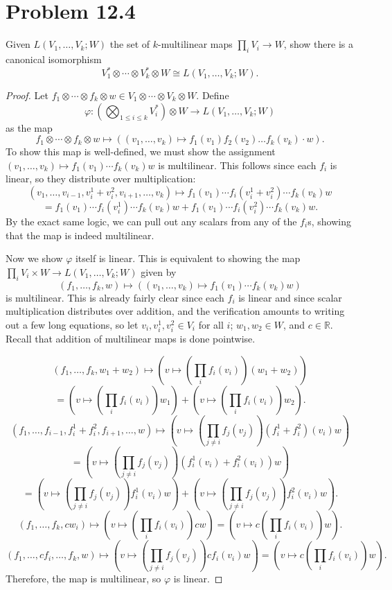 \documentclass[11pt, letterpaper]{article}
\begin{document}
\section{Problem 12.4}
\begin{problem}
	Given $L(V_1, \ldots ,V_k;W)$ the set of $k$-multilinear maps $\prod_{i} V_i \to W$, show there is a canonical isomorphism
	\[
		V_1^* \otimes \cdots \otimes V_k^* \otimes W \cong L(V_1, \ldots ,V_k;W)
	.\]
\end{problem}
\begin{proof}
	Let $f_1 \otimes \cdots \otimes f_k \otimes w\in V_1 \otimes \cdots \otimes V_k \otimes W$. Define
	\[
		\varphi : \left( \bigotimes_{1\leq i\leq k} V_i^* \right) \otimes W \to L(V_1, \ldots ,V_k;W)
	\]
	as the map
	\[
		f_1 \otimes \cdots \otimes f_k \otimes w \mapsto \left( (v_1, \ldots ,v_k)\mapsto f_1(v_1)f_2(v_2) \ldots f_k(v_k)\cdot w \right) 
	.\]
	To show this map is well-defined, we must show the assignment $(v_1, \ldots ,v_k)\mapsto f_1(v_1)\cdots f_k(v_k)w$ is multilinear. This follows since each $f_i$ is linear, so they distribute over multiplication:
	\[
		(v_1, \ldots ,v_{i-1} ,v_i^1+v_i^2, v_{i+1} , \ldots ,v_k)\mapsto f_1(v_1)\cdots f_i(v_i^1 + v_i^2)\cdots f_k(v_k)w
	\]
	\[
		=f_1(v_1)\cdots f_i(v_i^1)\cdots f_k(v_k)w+f_1(v_1)\cdots f_i(v_i^2)\cdots f_k(v_k)w
	.\]
	By the exact same logic, we can pull out any scalars from any of the $f_i$s, showing that the map is indeed multilinear.

	Now we show $\varphi $ itself is linear. This is equivalent to showing the map $\prod_{i} V_i \times W \to L(V_1, \ldots ,V_k;W)$ given by
	\[
		(f_1, \ldots ,f_k,w)\mapsto \left( (v_1, \ldots ,v_k)\mapsto f_1(v_1) \cdots f_k(v_k)w \right) 
	\]
	is multilinear. This is already fairly clear since each $f_i$ is linear and since scalar multiplication distributes over addition, and the verification amounts to writing out a few long equations, so let $v_i,v_i^1,v_i^2\in V_i$ for all $i$; $w_1,w_2\in W$, and $c\in \mathbb{R} $. Recall that addition of multilinear maps is done pointwise.

	\[
		(f_1, \ldots ,f_k, w_1 + w_2) \mapsto \left( v\mapsto \left( \prod_{i} f_i(v_i) \right) (w_1+w_2) \right) 
	\]
	\[
		=\left( v\mapsto \left( \prod_{i} f_i(v_i) \right) w_1 \right) +\left( v\mapsto \left( \prod_{i} f_i(v_i) \right) w_2 \right) 
	.\]
	\[
		\left( f_1, \ldots ,f_{i-1} ,f_i^1 + f_i^2, f_{i+1} , \ldots ,w \right) \mapsto \left( v\mapsto \left( \prod_{j \neq i} f_j(v_j) \right) (f_i^1+f_i^2)(v_i)w \right) 
	\]
	\[
		=\left( v\mapsto \left( \prod_{j \neq i} f_j(v_j) \right) (f_i^1(v_i)+f_i^2(v_i))w \right) 
	\]
	\[
		=\left( v\mapsto \left( \prod_{j \neq i} f_j(v_j) \right) f_i^1(v_i)w \right) +\left( v\mapsto \left( \prod_{j \neq i} f_j(v_j) \right) f_i^2(v_i)w \right) 
	.\]
	\[
		(f_1, \ldots ,f_k,cw_i)\mapsto \left( v\mapsto \left( \prod_{i} f_i(v_i) \right) cw \right) =\left( v\mapsto c\left( \prod_{i} f_i(v_i) \right) w \right) 
	.\]
	\[
		\left( f_1, \ldots ,cf_i, \ldots ,f_k,w \right) \mapsto \left( v\mapsto \left( \prod_{j\neq i} f_j(v_j) \right) cf_i(v_i)w \right) =\left( v\mapsto c\left( \prod_{i} f_i(v_i) \right) w \right) 
	.\]
	Therefore, the map is multilinear, so $\varphi $ is linear.


\end{proof}
\end{document}
